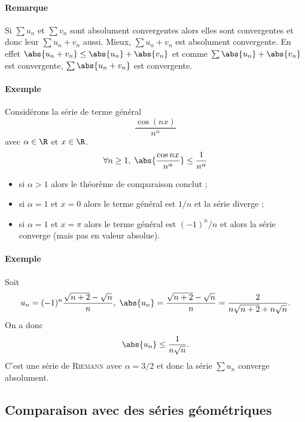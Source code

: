 \documentclass{livre}
\begin{document}

\paragraph{Remarque}Si $\sum u_n$ et $\sum v_n$ sont absolument convergentes alors elles sont convergentes et donc leur $\sum u_n+v_n$ aussi. Mieux, $\sum u_n+v_n$ est absolument convergente. En effet $\abs{u_n + v_n}\leq \abs{u_n} + \abs{v_n}$ et comme $\sum \abs{u_n} + \abs{v_n}$ est convergente, $\sum \abs{u_n + v_n}$ est convergente.

\paragraph{Exemple}Considérons la série de terme général \[ \frac{\cos(nx)}{n^{\alpha}}\]avec $\alpha\in \R$ et $x\in \R$.
\begin{align*}
\forall n\geq 1, \; \abs{\frac{\cos nx}{n^{\alpha}}}\leq \frac{1}{n^{\alpha}}
\end{align*}
\begin{itemize}
\item si $\alpha>1$ alors le théorème de comparaison conclut ;
\item si $\alpha=1$ et $x=0$ alors le terme général est $1/n$ et la série diverge ;
\item si $\alpha=1$ et $x = \pi$ alors le terme général est $(-1)^{n}/n$ et alors la série converge (mais pas en valeur absolue).
\end{itemize}

\paragraph{Exemple}Soit \[ u_n = (-1)^{n}\frac{\sqrt{n+2} - \sqrt{n}}{n}, \; \abs{u_n} = \frac{\sqrt{n+2}-\sqrt{n}}{n} = \frac{2}{n\sqrt{n+2} + n\sqrt{n}}.\]On a donc \[\abs{u_n} \leq \frac{1}{n\sqrt{n}}. \]C'est une série de \textsc{Riemann} avec $\alpha = 3/2$ et donc la série $\sum u_n$ converge absolument.

\subsection{Comparaison avec des séries géométriques}
\end{document}
